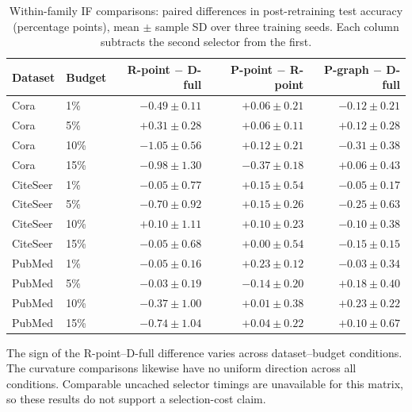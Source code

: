 \begin{table}[t]
\centering
\small
\setlength{\tabcolsep}{4pt}
\caption{Within-family IF comparisons: paired differences in post-retraining test accuracy (percentage points), mean $\pm$ sample SD over three training seeds. Each column subtracts the second selector from the first.}
\label{tab:if-family}
\begin{tabular}{llrrr}
\toprule
Dataset & Budget & R-point $-$ D-full & P-point $-$ R-point & P-graph $-$ D-full \\
\midrule
Cora & 1\% & $-0.49\pm0.11$ & $+0.06\pm0.21$ & $-0.12\pm0.21$ \\
Cora & 5\% & $+0.31\pm0.28$ & $+0.06\pm0.11$ & $+0.12\pm0.28$ \\
Cora & 10\% & $-1.05\pm0.56$ & $+0.12\pm0.21$ & $-0.31\pm0.38$ \\
Cora & 15\% & $-0.98\pm1.30$ & $-0.37\pm0.18$ & $+0.06\pm0.43$ \\
CiteSeer & 1\% & $-0.05\pm0.77$ & $+0.15\pm0.54$ & $-0.05\pm0.17$ \\
CiteSeer & 5\% & $-0.70\pm0.92$ & $+0.15\pm0.26$ & $-0.25\pm0.63$ \\
CiteSeer & 10\% & $+0.10\pm1.11$ & $+0.10\pm0.23$ & $-0.10\pm0.38$ \\
CiteSeer & 15\% & $-0.05\pm0.68$ & $+0.00\pm0.54$ & $-0.15\pm0.15$ \\
PubMed & 1\% & $-0.05\pm0.16$ & $+0.23\pm0.12$ & $-0.03\pm0.34$ \\
PubMed & 5\% & $-0.03\pm0.19$ & $-0.14\pm0.20$ & $+0.18\pm0.40$ \\
PubMed & 10\% & $-0.37\pm1.00$ & $+0.01\pm0.38$ & $+0.23\pm0.22$ \\
PubMed & 15\% & $-0.74\pm1.04$ & $+0.04\pm0.22$ & $+0.10\pm0.67$ \\
\bottomrule
\end{tabular}
\end{table}

The sign of the R-point--D-full difference varies across dataset--budget conditions. The curvature comparisons likewise have no uniform direction across all conditions. Comparable uncached selector timings are unavailable for this matrix, so these results do not support a selection-cost claim.

